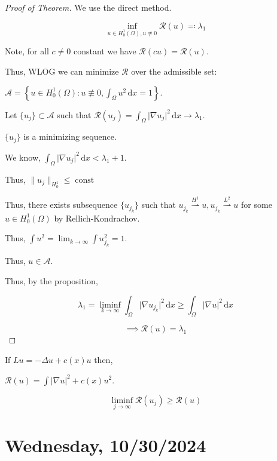 \documentclass{article}
\theoremstyle{definition}
\begin{document}
\begin{proof}
    [Proof of Theorem] We use the direct method.

    \[
        \inf_{u\in H^1_0(\Omega), u\not\equiv 0} \mathcal{R}(u) \eqqcolon \lambda_1
    \]

    Note, for all \(c\neq 0\) constant we have \(\mathcal{R} (cu) = \mathcal{R}(u)\).

    Thus, WLOG we can minimize \(\mathcal{R}\) over the admissible set:
    
    \(\mathcal{A} = \left\{ u\in H^1_0(\Omega) : u \not\equiv 0, \int_\Omega u^2 \,\mathrm{d} x = 1 \right\} \).

    Let \(\{ u_j \} \subset \mathcal{A}\) such that \(\mathcal{R}(u_j) = \int_{\Omega} \vert \nabla u_j \vert ^{2} \,\mathrm{d}x \to \lambda_1 \).

    \(\{ u_j \} \) is a minimizing sequence.

    We know, \(\int_{\Omega} \vert \nabla u_j \vert ^{2} \,\mathrm{d}x < \lambda_1 + 1\).

    Thus, \(\lVert u_j \rVert _{H^1_0} \leq \operatorname{const}\)

    Thus, there exists subsequence \(\{ u_{j_k}  \} \) such that \(u_{j_k} \overset{H^1}{\rightharpoonup} u, u_{j_k} \overset{L^2}{\rightharpoonup} u\) for some \(u\in H^1_0(\Omega)\) by Rellich-Kondrachov.

    Thus, \(\int u^2 = \lim_{k \to \infty} \int u_{j_k} ^2 = 1\).

    Thus, \(u\in \mathcal{A}\).
    
    Thus, by the proposition,

    \[
        \lambda_1 = \liminf_{k \to \infty} \int_{\Omega} \vert \nabla u_{j_k}  \vert ^{2} \,\mathrm{d}x \geq \int_{\Omega} \vert \nabla u \vert ^{2} \,\mathrm{d}x
    \]

    \[
        \implies \mathcal{R} (u) = \lambda_1
    \]


\end{proof}

If \(Lu = - \Delta u + c(x) u\) then,

\(\mathcal{R} (u) = \int \vert \nabla u \vert ^{2} + c(x) u ^{2}\).

\[
    \liminf_{j \to \infty} \mathcal{R} (u_j) \geq \mathcal{R} (u)
\]

\section*{Wednesday, 10/30/2024}
\end{document}

